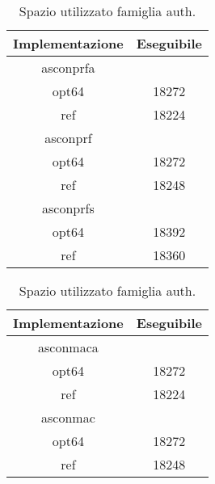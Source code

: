 \begin{table}[h]
    \caption{Spazio utilizzato famiglia auth.}
    \begin{minipage}[t]{0.5\linewidth}
        \centering
        \begin{tabular}{|c|c|}
            \hline
            Implementazione & Eseguibile \\
            \hline
            asconprfa & \\
            \hline
            opt64 & 18272 \\
            \hline
            ref & 18224 \\
            \hline
            asconprf & \\
            \hline
            opt64 & 18272 \\
            \hline
            ref & 18248 \\
            \hline
            asconprfs & \\
            \hline
            opt64 & 18392 \\
            \hline
            ref & 18360 \\
            \hline
        \end{tabular}
    \end{minipage}
    \begin{minipage}[t]{0.5\linewidth}
        \centering
        \begin{tabular}{|c|c|}
            \hline
            Implementazione & Eseguibile \\
            \hline
            asconmaca & \\
            \hline
            opt64 & 18272 \\
            \hline
            ref & 18224 \\
            \hline
            asconmac & \\
            \hline
            opt64 & 18272 \\
            \hline
            ref & 18248 \\
            \hline
        \end{tabular}
    \end{minipage}
\end{table}

